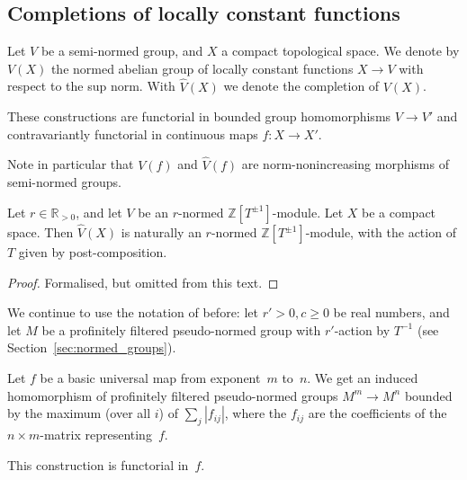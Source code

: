 \subsection{Completions of locally constant functions}

\begin{definition}
  \label{CLC}
  \leanok
  Let $V$ be a semi-normed group, and $X$ a compact topological space.
  We denote by $V(X)$ the normed abelian group of locally constant functions $X \to V$
  with respect to the sup norm.
  With $\hat V(X)$ we denote the completion of $V(X)$.

  These constructions are functorial in bounded group homomorphisms $V \to V'$
  and contravariantly functorial in continuous maps $f \colon X \to X'$.

  Note in particular that $V(f)$ and $\hat V(f)$ are norm-nonincreasing
  morphisms of semi-normed groups.
\end{definition}

\begin{lemma}
  \label{CLC_normed_with_aut}
  \leanok
  Let $r \in \mathbb R_{> 0}$,
  and let $V$ be an $r$-normed $\mathbb Z[T^{\pm 1}]$-module.
  Let $X$ be a compact space.
  Then $\hat V(X)$ is naturally an $r$-normed $\mathbb Z[T^{\pm 1}]$-module,
  with the action of $T$ given by post-composition.
\end{lemma}

\begin{proof}
  \leanok
  Formalised, but omitted from this text.
\end{proof}

We continue to use the notation of before:
let $r' > 0, c \ge 0$ be real numbers,
and let $M$ be a profinitely filtered pseudo-normed group with $r'$-action by $T^{-1}$
(see Section~\ref{sec:normed_groups}).

\begin{lemma}
  \label{basic_eval_FP}
  \leanok
  Let $f$ be a basic universal map from exponent~$m$ to~$n$.
  We get an induced homomorphism of
  profinitely filtered pseudo-normed groups $M^m \to M^n$
  bounded by the maximum (over all $i$) of $\sum_j |f_{ij}|$,
  where the $f_{ij}$ are the coefficients of the $n \times m$-matrix representing~$f$.

  This construction is functorial in~$f$.
\end{lemma}

